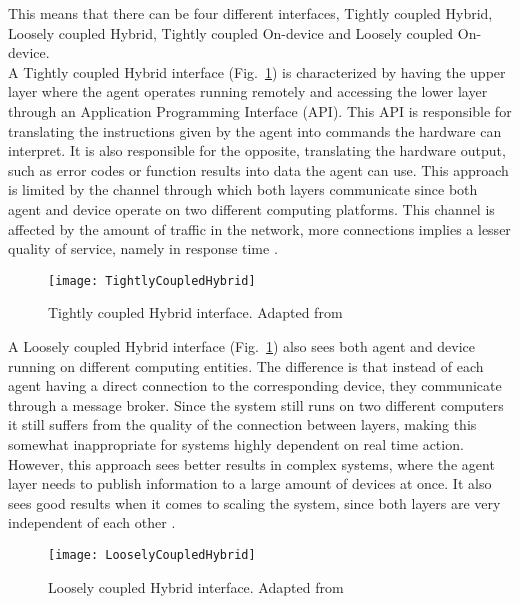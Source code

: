 This means that there can be four different interfaces, Tightly coupled Hybrid, Loosely coupled Hybrid, Tightly coupled On-device and Loosely coupled On-device.\\

A Tightly coupled Hybrid interface (Fig.~\ref{fig:tightly_coupled_hybrid}) is characterized by having the upper layer where the agent operates running remotely and accessing the lower layer through an Application Programming Interface (API). This API is responsible for translating the instructions given by the agent into commands the hardware can interpret. It is also responsible for the opposite, translating the hardware output, such as error codes or function results into data the agent can use. This approach is limited by the channel through which both layers communicate since both agent and device operate on two different computing platforms. This channel is affected by the amount of traffic in the network, more connections implies a lesser quality of service, namely in response time \cite{8591641}.\\

\begin{figure}[hbt!]
	\centering
	\texttt{[image: TightlyCoupledHybrid]}
	\caption{Tightly coupled Hybrid interface. Adapted from \cite{8591641}}
	\label{fig:tightly_coupled_hybrid}
\end{figure}

A Loosely coupled Hybrid interface (Fig.~\ref{fig:tightly_coupled_hybrid}) also sees both agent and device running on different computing entities. The difference is that instead of each agent having a direct connection to the corresponding device, they communicate through a message broker. Since the system still runs on two different computers it still suffers from the quality of the connection between layers, making this somewhat inappropriate for systems highly dependent on real time action. However, this approach sees better results in complex systems, where the agent layer needs to publish information to a large amount of devices at once. It also sees good results when it comes to scaling the system, since both layers are very independent of each other \cite{8591641}.\\

\begin{figure}[hbt!]
	\centering
	\texttt{[image: LooselyCoupledHybrid]}
	\caption{Loosely coupled Hybrid interface. Adapted from \cite{8591641}}
	\label{fig:loosely_coupled_hybrid}
\end{figure}

